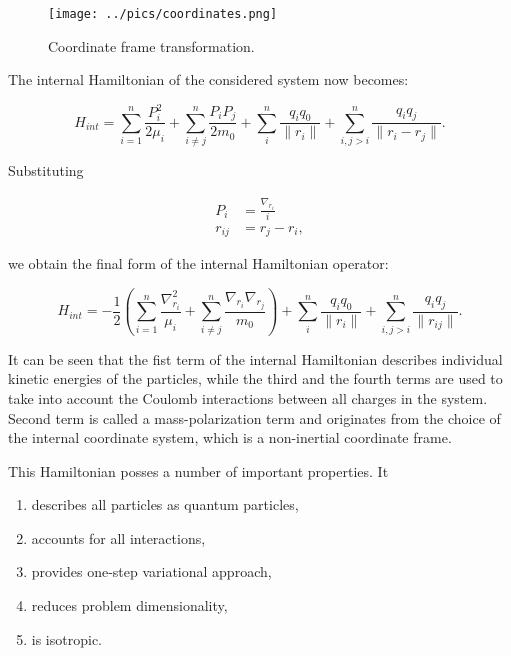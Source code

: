 \begin{figure}[H]
\begin{center}
\texttt{[image: ../pics/coordinates.png]}
\caption[Coordinate frame transformation]{Coordinate frame transformation. \label{coord}}
\end{center}
\end{figure}

The internal Hamiltonian of the considered system now becomes:

\begin{equation}
H_{int} = \sum_{i=1}^n \frac{P^{2}_i}{2\mu_i} + \sum_{ i \neq j }^n \frac{P_i P_j}{2 m_0}
+ \sum_{i}^{n} \frac{q_i q_0}{\| r_i \|} + \sum_{i,j>i}^{n} \frac{q_i q_j}{\| r_i - r_j \|}.
\end{equation}

Substituting 

\begin{align}
P_i &= \frac{\nabla_{r_i}}{i} \\
r_{ij} &= r_j - r_i,
\end{align}

we obtain the final form of the internal Hamiltonian operator:

\begin{equation}
H_{int} = -\frac{1}{2} \left( \sum_{i=1}^n \frac{\nabla^2_{r_i}}{\mu_i} + \sum_{ i \neq j }^n \frac{\nabla_{r_i} \nabla_{r_j}}{m_0} \right)
+ \sum_{i}^{n} \frac{q_i q_0}{\| r_i \|} + \sum_{i,j>i}^{n} \frac{q_i q_j}{\| r_{ij} \|}.
\label{intH}
\end{equation}

It can be seen that the fist term of the internal Hamiltonian describes 
individual kinetic energies of the particles, while the third and the fourth
terms are used to take into account the Coulomb interactions between all
charges in the system. Second term is called a mass-polarization term and
originates from the choice of the internal coordinate system, which is
a non-inertial coordinate frame.

This Hamiltonian posses a number of important properties. It 
\begin{enumerate}
  \item describes all particles as quantum particles,
  \item accounts for all interactions,
  \item provides one-step variational approach,
  \item reduces problem dimensionality,
  \item is isotropic.
\end{enumerate}

